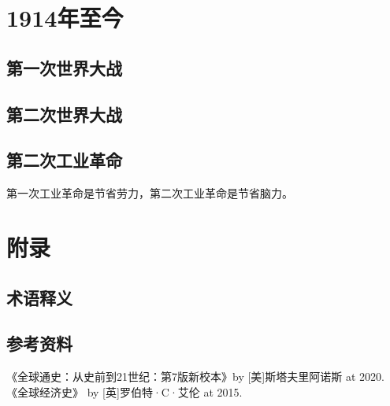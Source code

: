 \documentclass[12pt,oneside]{book}
\begin{document}
\part{1914年至今}

\chapter{第一次世界大战}


\chapter{第二次世界大战}


\chapter{第二次工业革命}
第一次工业革命是节省劳力，第二次工业革命是节省脑力。



\appendix
\part{附录}
\chapter{术语释义}



\backmatter
\chapter*{参考资料}
\begin{thebibliography}{99}
 《全球通史：从史前到21世纪：第7版新校本》by [美]斯塔夫里阿诺斯 at 2020.
 《全球经济史》 by [英]罗伯特·C·艾伦 at 2015.

\end{thebibliography}
\end{document}
